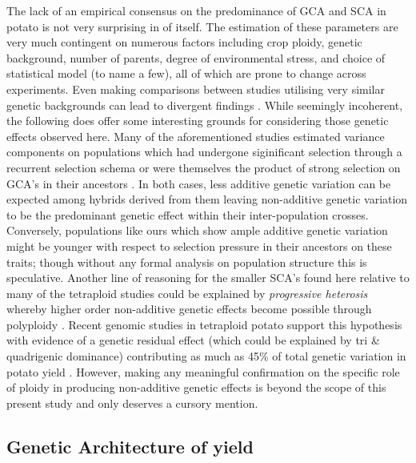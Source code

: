 The lack of an empirical consensus on the predominance of GCA and SCA in potato is not very surprising in of itself. The estimation of these parameters are very much contingent on numerous factors including crop ploidy, genetic background, number of parents, degree of environmental stress, and choice of statistical model (to name a few), all of which are prone to change across experiments. Even making comparisons between studies utilising very similar genetic backgrounds can lead to divergent findings \citep{Tarn1977, Maris1989}. While seemingly incoherent, the following does offer some interesting grounds for considering those genetic effects observed here. Many of the aforementioned studies estimated variance components on populations which had undergone siginificant selection through a recurrent selection schema \citep{Haynes2001, Maris1989} or were themselves the product of strong selection on GCA's in their ancestors \citep{Tai1976}. In both cases, less additive genetic variation can be expected among hybrids derived from them leaving non-additive genetic variation to be the predominant genetic effect within their inter-population crosses. Conversely, populations like ours which show ample additive genetic variation might be younger with respect to selection pressure in their ancestors on these traits; though without any formal analysis on population structure this is speculative. Another line of reasoning for the smaller SCA's found here relative to many of the tetraploid studies could be explained by \emph{progressive heterosis} whereby higher order non-additive genetic effects become possible through polyploidy \citep{Birchler2003}. Recent genomic studies in tetraploid potato support this hypothesis with evidence of a genetic residual effect (which could be explained by tri \& quadrigenic dominance) contributing as much as 45\% of total genetic variation in potato yield \citep{Endelman2018}. However, making any meaningful confirmation on the specific role of ploidy in producing non-additive genetic effects is beyond the scope of this present study and only deserves a cursory mention.

\subsection{Genetic Architecture of yield}\label{genetic-architecture-of-yield}

